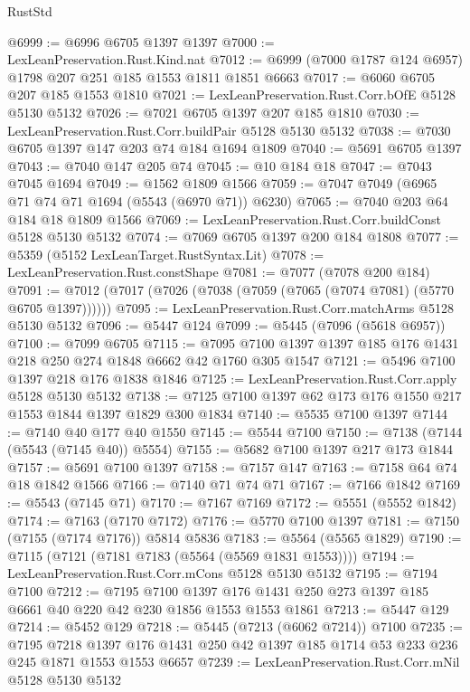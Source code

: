 \begin{lexlean}{RustStd}
\begin{coremodule}
@6999 := @6996 @6705 @1397 @1397
@7000 := LexLeanPreservation.Rust.Kind.nat
@7012 := @6999 (@7000 @1787 @124 @6957) @1798 @207 @251 @185 @1553 @1811 @1851 @6663
@7017 := @6060 @6705 @207 @185 @1553 @1810
@7021 := LexLeanPreservation.Rust.Corr.bOfE @5128 @5130 @5132
@7026 := @7021 @6705 @1397 @207 @185 @1810
@7030 := LexLeanPreservation.Rust.Corr.buildPair @5128 @5130 @5132
@7038 := @7030 @6705 @1397 @147 @203 @74 @184 @1694 @1809
@7040 := @5691 @6705 @1397
@7043 := @7040 @147 @205 @74
@7045 := @10 @184 @18
@7047 := @7043 @7045 @1694
@7049 := @1562 @1809 @1566
@7059 := @7047 @7049 (@6965 @71 @74 @71 @1694 (@5543 (@6970 @71)) @6230)
@7065 := @7040 @203 @64 @184 @18 @1809 @1566
@7069 := LexLeanPreservation.Rust.Corr.buildConst @5128 @5130 @5132
@7074 := @7069 @6705 @1397 @200 @184 @1808
@7077 := @5359 (@5152 LexLeanTarget.RustSyntax.Lit)
@7078 := LexLeanPreservation.Rust.constShape
@7081 := @7077 (@7078 @200 @184)
@7091 := @7012 (@7017 (@7026 (@7038 (@7059 (@7065 (@7074 @7081) (@5770 @6705 @1397))))))
@7095 := LexLeanPreservation.Rust.Corr.matchArms @5128 @5130 @5132
@7096 := @5447 @124
@7099 := @5445 (@7096 (@5618 @6957))
@7100 := @7099 @6705
@7115 := @7095 @7100 @1397 @1397 @185 @176 @1431 @218 @250 @274 @1848 @6662 @42 @1760 @305 @1547
@7121 := @5496 @7100 @1397 @218 @176 @1838 @1846
@7125 := LexLeanPreservation.Rust.Corr.apply @5128 @5130 @5132
@7138 := @7125 @7100 @1397 @62 @173 @176 @1550 @217 @1553 @1844 @1397 @1829 @300 @1834
@7140 := @5535 @7100 @1397
@7144 := @7140 @40 @177 @40 @1550
@7145 := @5544 @7100
@7150 := @7138 (@7144 (@5543 (@7145 @40)) @5554)
@7155 := @5682 @7100 @1397 @217 @173 @1844
@7157 := @5691 @7100 @1397
@7158 := @7157 @147
@7163 := @7158 @64 @74 @18 @1842 @1566
@7166 := @7140 @71 @74 @71
@7167 := @7166 @1842
@7169 := @5543 (@7145 @71)
@7170 := @7167 @7169
@7172 := @5551 (@5552 @1842)
@7174 := @7163 (@7170 @7172)
@7176 := @5770 @7100 @1397
@7181 := @7150 (@7155 (@7174 @7176)) @5814 @5836
@7183 := @5564 (@5565 @1829)
@7190 := @7115 (@7121 (@7181 @7183 (@5564 (@5569 @1831 @1553))))
@7194 := LexLeanPreservation.Rust.Corr.mCons @5128 @5130 @5132
@7195 := @7194 @7100
@7212 := @7195
    @7100
    @1397
    @176
    @1431
    @250
    @273
    @1397
    @185
    @6661
    @40
    @220
    @42
    @230
    @1856
    @1553
    @1553
    @1861
@7213 := @5447 @129
@7214 := @5452 @129
@7218 := @5445 (@7213 (@6062 @7214)) @7100
@7235 := @7195
    @7218
    @1397
    @176
    @1431
    @250
    @42
    @1397
    @185
    @1714
    @53
    @233
    @236
    @245
    @1871
    @1553
    @1553
    @6657
@7239 := LexLeanPreservation.Rust.Corr.mNil @5128 @5130 @5132

\end{coremodule}
\end{lexlean}
